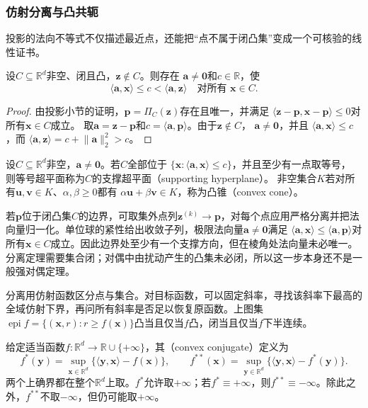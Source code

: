 \subsubsection{仿射分离与凸共轭}

投影的法向不等式不仅描述最近点，还能把“点不属于闭凸集”变成一个可核验的线性证书。

\begin{theorem}[闭凸集外一点的严格分离]
\label{thm:opt-projection-separation}
设$C\subseteq\mathbb{R}^d$非空、闭且凸，$\bm z\notin C$。则存在
$\bm a\neq\bm0$和$c\in\mathbb R$，使
\[
 \langle\bm a,\bm x\rangle\leq c
 <\langle\bm a,\bm z\rangle
 \quad\text{对所有 }\bm x\in C.
\]
\end{theorem}

\begin{proof}
由投影小节的证明，$\bm p=\Pi_C(\bm z)$存在且唯一，并满足
$\langle\bm z-\bm p,\bm x-\bm p\rangle\leq0$对所有$\bm x\in C$成立。
取$\bm a=\bm z-\bm p$和$c=\langle\bm a,\bm p\rangle$。由于$\bm z\notin C$，
$\bm a\neq\bm0$，并且
$\langle\bm a,\bm x\rangle\leq c$，而
$\langle\bm a,\bm z\rangle=c+\lVert\bm a\rVert_2^2>c$。
\end{proof}

\begin{definition}[支撑超平面与凸锥]
\label{def:opt-supporting-hyperplane-cone}
设$C\subseteq\mathbb R^d$非空，$\bm a\neq\bm0$。若$C$全部位于
$\{\bm x:\langle\bm a,\bm x\rangle\leq c\}$，并且至少有一点取等号，
则等号超平面称为$C$的支撑超平面（supporting hyperplane）。
非空集合$K$若对所有$\bm u,\bm v\in K$、$\alpha,\beta\geq0$都有
$\alpha\bm u+\beta\bm v\in K$，称为凸锥（convex cone）。
\end{definition}

若$\bm p$位于闭凸集$C$的边界，可取集外点列$\bm z^{(k)}\to\bm p$，对每个点应用严格分离并把法向量归一化。单位球的紧性给出收敛子列，极限法向量$\bm a\neq\bm0$满足
$\langle\bm a,\bm x\rangle\leq\langle\bm a,\bm p\rangle$对所有$\bm x\in C$成立。因此边界处至少有一个支撑方向，但在棱角处法向量未必唯一。分离定理需要集合闭；对偶中由扰动产生的凸集未必闭，所以这一步本身还不是一般强对偶定理。

分离用仿射函数区分点与集合。对目标函数，可以固定斜率，寻找该斜率下最高的全域仿射下界，再问所有斜率是否足以恢复原函数。上图集
$\operatorname{epi}f=\{(\bm x,r):r\geq f(\bm x)\}$凸当且仅当$f$凸，闭当且仅当$f$下半连续。

\begin{definition}[凸共轭与双共轭]
\label{def:opt-conjugate}
给定适当函数$f:\mathbb R^d\to\mathbb R\cup\{+\infty\}$，其（convex conjugate）定义为
\begin{equation}
 f^*(\bm y)=\sup_{\bm x\in\mathbb R^d}
 \{\langle\bm y,\bm x\rangle-f(\bm x)\},
 \qquad
 f^{**}(\bm x)=\sup_{\bm y\in\mathbb R^d}
 \{\langle\bm y,\bm x\rangle-f^*(\bm y)\}.
 \label{eq:opt-conjugate-biconjugate}
\end{equation}
两个上确界都在整个$\mathbb R^d$上取。$f^*$允许取$+\infty$；若$f^*\equiv+\infty$，则$f^{**}\equiv-\infty$。除此之外，$f^{**}$不取$-\infty$，但仍可能取$+\infty$。
\end{definition}

